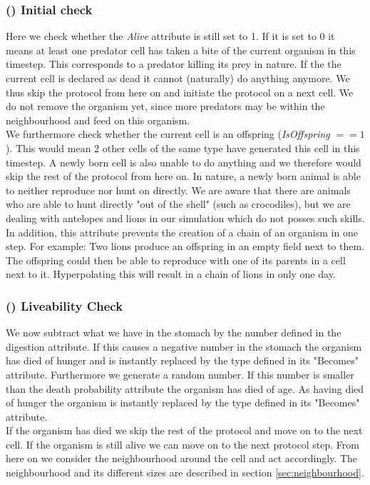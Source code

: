 \documentclass[11pt]{article}
\begin{document}
\subsubsection{() Initial check} 
Here we check whether the {\it Alive} attribute is still set to 1. If it is set to 0 it means at least one predator cell has taken a bite of the current organism in this timestep.  This corresponds to a predator killing its prey in nature. If the the current cell is declared as dead it cannot (naturally) do anything anymore. We thus skip the protocol from here on and initiate the protocol on a next cell. We do not remove the organism yet, since more predators may be within the neighbourhood and feed on this organism.
\\We furthermore check whether the current cell is an offspring ({\it IsOffspring} $== 1$). This would mean 2 other cells of the same type have generated this cell in this timestep. A newly born cell is also unable to do anything and we therefore would skip the rest of the protocol from here on. In nature, a newly born animal is able to neither reproduce nor hunt on directly. We are aware that there are animals who are able to hunt directly "out of the shell" (such as crocodiles), but we are dealing with antelopes and lions in our simulation which do not posses such skills. In addition, this attribute prevents the creation of a chain of an organism in one step. For example: Two lions produce an offspring in an empty field next to them. The offspring could then be able to reproduce with one of its parents in a cell next to it. Hyperpolating this will result in a chain of lions in only one day.

\addtocounter{protocolCounter}{1}
\subsubsection{() Liveability Check} 
We now subtract what we have in the stomach by the number defined in the digestion attribute. If this causes a negative number in the stomach the organism has died of hunger and is instantly replaced by the type defined in its "Becomes" attribute. Furthermore we generate a random number. If this number is smaller than the death probability attribute the organism has died of age. As having died of hunger the organism is instantly replaced by the type defined in its "Becomes" attribute.\\
If the organism has died we skip the rest of the protocol and move on to the next cell. If the organism is still alive we can move on to the next protocol step. From here on we consider the neighbourhood around the cell and act accordingly. The neighbourhood and its different sizes are described in section \ref{sec:neighbourhood}.
\end{document}
